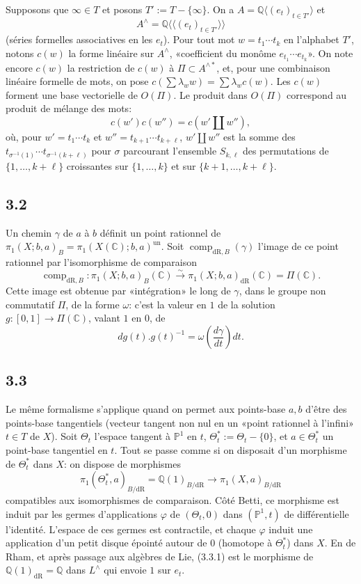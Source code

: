 \documentclass[10pt]{article}
\newcommand{\Q}{\mathbb Q}
\newcommand{\C}{\mathbb C}
\newcommand{\PP}{\mathbb P}
\newcommand{\comp}{\operatorname{comp}}
\newcommand{\dR}{\mathrm{dR}}
\newcommand{\sh}{\mathbin{\amalg}}
\begin{document}
Supposons que $\infty\in T$ et posons $T':=T-\{\infty\}$. On a $A=\Q\langle(e_t)_{t\in T'}\rangle$ et
\[
A^\wedge=\Q\langle\!\langle(e_t)_{t\in T'}\rangle\!\rangle
\]
(séries formelles associatives en les $e_t$). Pour tout mot $w=t_1\cdots t_k$ en l'alphabet $T'$, notons $c(w)$ la forme linéaire sur $A^\wedge$, «coefficient du monôme $e_{t_1}\cdots e_{t_k}$». On note encore $c(w)$ la restriction de $c(w)$ à $\Pi\subset A^{\wedge *}$, et, pour une combinaison linéaire formelle de mots, on pose $c(\sum\lambda_w w)=\sum\lambda_w c(w)$. Les $c(w)$ forment une base vectorielle de $O(\Pi)$. Le produit dans $O(\Pi)$ correspond au produit de mélange des mots:
\begin{equation}
 c(w')c(w'')=c(w'\sh w''),
\tag{3.1.5}
\end{equation}
où, pour $w'=t_1\cdots t_k$ et $w''=t_{k+1}\cdots t_{k+\ell}$, $w'\sh w''$ est la somme des $t_{\sigma^{-1}(1)}\cdots t_{\sigma^{-1}(k+\ell)}$ pour $\sigma$ parcourant l'ensemble $S_{k,\ell}$ des permutations de $\{1,\ldots,k+\ell\}$ croissantes sur $\{1,\ldots,k\}$ et sur $\{k+1,\ldots,k+\ell\}$.

\subsection*{3.2}
Un chemin $\gamma$ de $a$ à $b$ définit un point rationnel de $\pi_1(X;b,a)_B=\pi_1(X(\C);b,a)^{\mathrm{un}}$. Soit $\comp_{\dR,B}(\gamma)$ l'image de ce point rationnel par l'isomorphisme de comparaison
\[
\comp_{\dR,B}:\pi_1(X;b,a)_B(\C)\xrightarrow{\sim}\pi_1(X;b,a)_{\dR}(\C)=\Pi(\C).
\]
Cette image est obtenue par «intégration» le long de $\gamma$, dans le groupe non commutatif $\Pi$, de la forme $\omega$: c'est la valeur en $1$ de la solution $g:[0,1]\to\Pi(\C)$, valant $1$ en $0$, de
\begin{equation}
 dg(t).g(t)^{-1}=\omega\left(\frac{d\gamma}{dt}\right)dt.
\tag{3.2.1}
\end{equation}

\subsection*{3.3}
Le même formalisme s'applique quand on permet aux points-base $a,b$ d'être des points-base tangentiels (vecteur tangent non nul en un «point rationnel à l'infini» $t\in T$ de $X$). Soit $\Theta_t$ l'espace tangent à $\PP^1$ en $t$, $\Theta_t^*:=\Theta_t-\{0\}$, et $a\in\Theta_t^*$ un point-base tangentiel en $t$. Tout se passe comme si on disposait d'un morphisme de $\Theta_t^*$ dans $X$: on dispose de morphismes
\begin{equation}
 \pi_1(\Theta_t^*,a)_{B/\dR}=\Q(1)_{B/\dR}\longrightarrow\pi_1(X,a)_{B/\dR}
\tag{3.3.1}
\end{equation}
compatibles aux isomorphismes de comparaison. Côté Betti, ce morphisme est induit par les germes d'applications $\varphi$ de $(\Theta_t,0)$ dans $(\PP^1,t)$ de différentielle l'identité. L'espace de ces germes est contractile, et chaque $\varphi$ induit une application d'un petit disque épointé autour de $0$ (homotope à $\Theta_t^*$) dans $X$. En de Rham, et après passage aux algèbres de Lie, (3.3.1) est le morphisme de $\Q(1)_{\dR}=\Q$ dans $L^\wedge$ qui envoie $1$ sur $e_t$.
\end{document}
